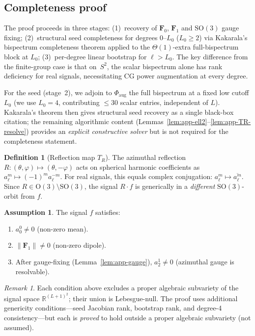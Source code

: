 \documentclass{article}
\theoremstyle{definition}
\newtheorem{definition}[theorem]{Definition}
\theoremstyle{remark}
\newtheorem{remark}[theorem]{Remark}
\newcommand{\R}{\mathbb{R}}
\newcommand{\SO}{\mathrm{SO}}
\newcommand{\OG}{\mathrm{O}}
\newcommand{\norm}[1]{\lVert #1 \rVert}
\newcommand{\conj}[1]{\overline{#1}}
\theoremstyle{definition}
\newtheorem{assumption}[theorem]{Assumption}
\begin{document}
\subsection{Completeness proof}

The proof proceeds in three stages: (1)~recovery of $\mathbf{F}_0$,
$\mathbf{F}_1$ and $\SO(3)$ gauge fixing; (2)~structural seed
completeness for degrees $0$--$L_0$ ($L_0 \ge 2$) via Kakarala's
bispectrum completeness theorem applied to the
$\Theta(1)$-extra full-bispectrum block at $L_0$; (3)~per-degree
linear bootstrap for $\ell > L_0$.
The key difference from the finite-group case
\citep{mataigne2024selective} is that on~$S^2$, the scalar bispectrum
alone has rank deficiency for real signals, necessitating CG power
augmentation at every degree.

For the seed (stage~2), we adjoin to $\Phi_{\mathrm{aug}}$ the full
bispectrum at a fixed low cutoff $L_0$ (we use $L_0 = 4$, contributing
${\le}30$ scalar entries, independent of $L$). Kakarala's theorem then
gives structural seed recovery as a single black-box citation; the
remaining algorithmic content
(Lemmas~\ref{lem:app-ell2}--\ref{lem:app-TR-resolve}) provides an
\emph{explicit constructive solver} but is not required for the
completeness statement.

\begin{definition}[Reflection map $T_R$]\label{def:app-TR}
The azimuthal reflection $R: (\theta,\varphi) \mapsto (\theta,-\varphi)$
acts on spherical harmonic coefficients as
$a_\ell^m \mapsto (-1)^m a_\ell^{-m}$.
For real signals, this equals complex conjugation: $a_\ell^m \mapsto \conj{a_\ell^m}$.
Since $R \in \OG(3) \setminus \SO(3)$, the signal $R \cdot f$ is generically
in a \emph{different} $\SO(3)$-orbit from $f$.
\end{definition}

\begin{assumption}\label{ass:app-generic}
The signal $f$ satisfies:
\begin{enumerate}[label=(G\arabic*),nosep]
  \item $a_0^0 \ne 0$ (non-zero mean).
  \item $\norm{\mathbf{F}_1} \ne 0$ (non-zero dipole).
  \item After gauge-fixing (Lemma~\ref{lem:app-gauge}), $a_2^1 \ne 0$
    (azimuthal gauge is resolvable).
\end{enumerate}
\end{assumption}

\begin{remark}
Each condition above excludes a proper algebraic subvariety of the signal
space $\R^{(L+1)^2}$; their union is Lebesgue-null.
The proof uses additional genericity conditions---seed Jacobian rank,
bootstrap rank, and degree-4 consistency---but each is \emph{proved}
to hold outside a proper algebraic subvariety (not assumed).
\end{remark}
\end{document}
